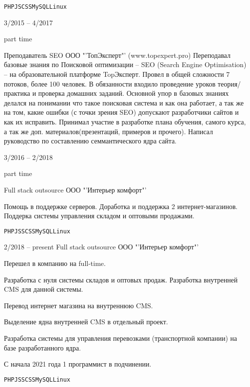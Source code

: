 \documentclass[10pt]{tpl/developercv} %
\begin{document}
\begin{entrylist}
{		\texttt{PHP}\slashsep\texttt{JS}\slashsep\texttt{CSS}\slashsep\texttt{MySQL}\slashsep\texttt{Linux}}
	\entry
		{3/2015 -- 4/2017

		\footnotesize{part time}}
		{Преподаватель SEO}
		{ООО "'ТопЭксперт"' (www.topexpert.pro)}
		{Переподавал базовые знания по Поисковой оптимизации -- SEO (Search Engine Optimisation) -- на образовательной платформе TopЭксперт. Провел в общей сложности 7 потоков, более 100 человек. В обязанности входило проведение уроков теория/практика и проверка домашних заданий. Основной упор в базовых знаниях делался на понимании что такое поисковая система и как она работает, а так же на том, какие ошибки (с точки зрения SEO) допускают разработчики сайтов и как их исправить. Принимал участие в разработке плана обучения, самого курса, а так же доп. материалов(презентаций, примеров и прочего). Написал руководство по составлению семмантического ядра сайта.}
	\entry
		{3/2016 -- 2/2018

		\footnotesize{part time}}
		{Full stack outsource}
		{ООО "'Интерьер комфорт"' }
		{Помощь в поддержке серверов. Доработка и поддержка 2 интернет-магазинов. Поддерка системы управления складом и оптовыми продажами.

		\texttt{PHP}\slashsep\texttt{JS}\slashsep\texttt{SCSS}\slashsep\texttt{MySQL}\slashsep\texttt{Linux}}
	\entry
		{2/2018 -- present}
		{Full stack outsource}
		{ООО "'Интерьер комфорт"' }
		{
    Перешел в компанию на full-time.

    Разработка с нуля системы складов и оптовых продаж. Разработка внутренней CMS для данной системы.

		Перевод интернет магазина на внутреннюю CMS.

		Выделение ядна внутренней CMS в отдельный проект.

		Разработка системы для управления перевозками (транспортной компании) на базе разработанного ядра.

		С начала 2021 года 1 программист в подчинении.

		\texttt{PHP}\slashsep\texttt{JS}\slashsep\texttt{SCSS}\slashsep\texttt{MySQL}\slashsep\texttt{Linux}}
\end{entrylist}


\end{document}
